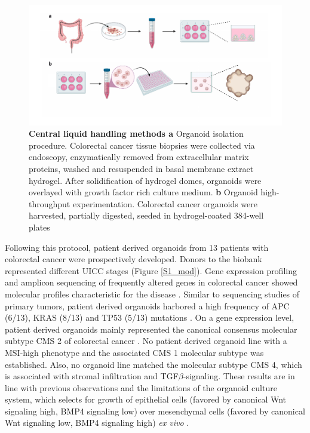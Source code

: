 \begin{flushleft}
\begin{figure}[h]
\centering
\includegraphics[width=\textwidth,
                height=\textheight,
                keepaspectratio]{figures/pdf/fig_110.pdf}
\caption{\textbf{Central liquid handling methods a} Organoid isolation procedure. Colorectal cancer tissue biopsies were collected via endoscopy, enzymatically removed from extracellular matrix proteins, washed and resuspended in basal membrane extract hydrogel. After solidification of hydrogel domes, organoids were overlayed with growth factor rich culture medium. \textbf{b} Organoid high-throughput experimentation. Colorectal cancer organoids were harvested, partially digested, seeded in hydrogel-coated 384-well plates}
\label{fig_110}
\end{figure}

Following this protocol, patient derived organoids from 13 patients with colorectal cancer were prospectively developed. Donors to the biobank represented different UICC stages (Figure \ref{S1_mod}). Gene expression profiling and amplicon sequencing of frequently altered genes in colorectal cancer showed molecular profiles characteristic for the disease . Similar to sequencing studies of primary tumors, patient derived organoids harbored a high frequency of APC (6/13), KRAS (8/13) and TP53 (5/13) mutations \cite{Muzny2012-hr}. On a gene expression level, patient derived organoids mainly represented the canonical consensus molecular subtype CMS 2 of colorectal cancer \cite{Guinney2015-ex}. No patient derived organoid line with a MSI-high phenotype and the associated CMS 1 molecular subtype was established. Also, no organoid line matched the molecular subtype CMS 4, which is associated with stromal infiltration and TGF\(\beta\)-signaling. These results are in line with previous observations \cite{Van_De_Wetering2015-ko, Schutte2017-fl} and the limitations of the organoid culture system, which selects for growth of epithelial cells (favored by canonical Wnt signaling high, BMP4 signaling low) over mesenchymal cells (favored by canonical Wnt signaling low, BMP4 signaling high) \textit{ex vivo} \cite{Sato2011-lh}.


\end{flushleft}
